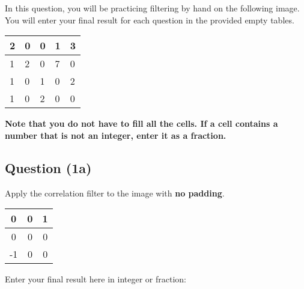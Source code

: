 \documentclass[12pt]{article}
\begin{document}

\noindent In this question, you will be practicing filtering by hand on the following image. You will enter your final result for each question in the provided empty tables.

\begin{center}
\begin{tabular}{|l|l|l|l|l|}
\hline
2 & 0 & 0 & 1 & 3 \\ \hline
1 & 2 & 0 & 7 & 0 \\ \hline
1 & 0 & 1 & 0 & 2 \\ \hline
1 & 0 & 2 & 0 & 0 \\ \hline
\end{tabular}
\end{center}
\textbf{Note that you do not have to fill all the cells. If a cell contains a number that is not an integer, enter it as a fraction.}

\subsection*{Question (1a)} Apply the correlation filter to the image with \textbf{no padding}.
\begin{center}
\begin{tabular}{|c|c|c|}
\hline
0  & 0 & 1 \\ \hline
0  & 0 & 0 \\ \hline
-1 & 0 & 0 \\ \hline
\end{tabular}
\end{center}

\noindent Enter your final result here in integer or fraction:
\end{document}
